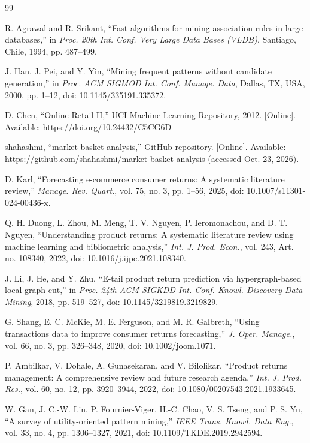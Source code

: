 \documentclass[11pt,a4paper]{article}
\begin{document}
\footnotesize
\begin{thebibliography}{99}
\setlength{\itemsep}{1pt}

R. Agrawal and R. Srikant, ``Fast algorithms for mining association rules in large databases,'' in \emph{Proc. 20th Int. Conf. Very Large Data Bases (VLDB)}, Santiago, Chile, 1994, pp. 487--499.

J. Han, J. Pei, and Y. Yin, ``Mining frequent patterns without candidate generation,'' in \emph{Proc. ACM SIGMOD Int. Conf. Manage. Data}, Dallas, TX, USA, 2000, pp. 1--12, doi: 10.1145/335191.335372.

D. Chen, ``Online Retail II,'' UCI Machine Learning Repository, 2012. [Online]. Available: \url{https://doi.org/10.24432/C5CG6D}

shahashmi, ``market-basket-analysis,'' GitHub repository. [Online]. Available: \url{https://github.com/shahashmi/market-basket-analysis} (accessed Oct. 23, 2026).

D. Karl, ``Forecasting e-commerce consumer returns: A systematic literature review,'' \emph{Manage. Rev. Quart.}, vol. 75, no. 3, pp. 1--56, 2025, doi: 10.1007/s11301-024-00436-x.

Q. H. Duong, L. Zhou, M. Meng, T. V. Nguyen, P. Ieromonachou, and D. T. Nguyen, ``Understanding product returns: A systematic literature review using machine learning and bibliometric analysis,'' \emph{Int. J. Prod. Econ.}, vol. 243, Art. no. 108340, 2022, doi: 10.1016/j.ijpe.2021.108340.

J. Li, J. He, and Y. Zhu, ``E-tail product return prediction via hypergraph-based local graph cut,'' in \emph{Proc. 24th ACM SIGKDD Int. Conf. Knowl. Discovery Data Mining}, 2018, pp. 519--527, doi: 10.1145/3219819.3219829.

G. Shang, E. C. McKie, M. E. Ferguson, and M. R. Galbreth, ``Using transactions data to improve consumer returns forecasting,'' \emph{J. Oper. Manage.}, vol. 66, no. 3, pp. 326--348, 2020, doi: 10.1002/joom.1071.

P. Ambilkar, V. Dohale, A. Gunasekaran, and V. Bilolikar, ``Product returns management: A comprehensive review and future research agenda,'' \emph{Int. J. Prod. Res.}, vol. 60, no. 12, pp. 3920--3944, 2022, doi: 10.1080/00207543.2021.1933645.

W. Gan, J. C.-W. Lin, P. Fournier-Viger, H.-C. Chao, V. S. Tseng, and P. S. Yu, ``A survey of utility-oriented pattern mining,'' \emph{IEEE Trans. Knowl. Data Eng.}, vol. 33, no. 4, pp. 1306--1327, 2021, doi: 10.1109/TKDE.2019.2942594.


\end{thebibliography}
\end{document}
